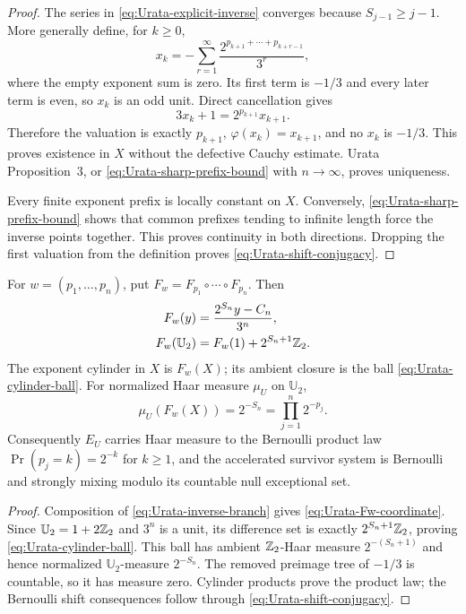 \begin{proof}
The series in \eqref{eq:Urata-explicit-inverse} converges because
$S_{j-1}\geq j-1$.  More generally define, for $k\geq0$,
\[
 x_k=-\sum_{r=1}^{\infty}
 \frac{2^{p_{k+1}+\cdots+p_{k+r-1}}}{3^r},
\]
where the empty exponent sum is zero.  Its first term is $-1/3$ and every
later term is even, so $x_k$ is an odd unit.  Direct cancellation gives
\begin{equation}
\label{eq:Urata-suffix-identity}
 3x_k+1=2^{p_{k+1}}x_{k+1}.
\end{equation}
Therefore the valuation is exactly $p_{k+1}$,
$\varphi(x_k)=x_{k+1}$, and no $x_k$ is $-1/3$.  This proves existence in
$X$ without the defective Cauchy estimate.  Urata Proposition~3, or
\eqref{eq:Urata-sharp-prefix-bound} with $n\to\infty$, proves uniqueness.

Every finite exponent prefix is locally constant on $X$.  Conversely,
\eqref{eq:Urata-sharp-prefix-bound} shows that common prefixes tending to
infinite length force the inverse points together.  This proves continuity in
both directions.  Dropping the first valuation from the definition proves
\eqref{eq:Urata-shift-conjugacy}.
\end{proof}

\begin{corollary}
\label{cor:Urata-cylinders-Haar}
For $w=(p_1,\ldots,p_n)$, put
$F_w=F_{p_1}\circ\cdots\circ F_{p_n}$.  Then
\begin{align}
 F_w(y)&=\frac{2^{S_n}y-C_n}{3^n},
 \label{eq:Urata-Fw-coordinate}\\
 F_w(\mathbb U_2)&=F_w(1)+2^{S_n+1}\mathbb{Z}_{2}.
 \label{eq:Urata-cylinder-ball}
\end{align}
The exponent cylinder in $X$ is $F_w(X)$; its ambient closure is the ball
\eqref{eq:Urata-cylinder-ball}.  For normalized Haar measure $\mu_U$
on $\mathbb U_2$,
\begin{equation}
\label{eq:Urata-cylinder-measure}
 \mu_U(F_w(X))
 =2^{-S_n}=\prod_{j=1}^{n}2^{-p_j}.
\end{equation}
Consequently $E_U$ carries Haar measure to the Bernoulli product law
$\Pr(p_j=k)=2^{-k}$ for $k\geq1$, and the accelerated survivor system is
Bernoulli and strongly mixing modulo its countable null exceptional set.
\end{corollary}

\begin{proof}
Composition of \eqref{eq:Urata-inverse-branch} gives
\eqref{eq:Urata-Fw-coordinate}.  Since
$\mathbb U_2=1+2\mathbb{Z}_{2}$ and $3^n$ is a unit, its difference set is exactly
$2^{S_n+1}\mathbb{Z}_{2}$, proving \eqref{eq:Urata-cylinder-ball}.  This ball has
ambient $\mathbb{Z}_{2}$-Haar measure $2^{-(S_n+1)}$ and hence normalized
$\mathbb U_2$-measure $2^{-S_n}$.  The removed preimage tree of $-1/3$ is
countable, so it has measure zero.  Cylinder products prove the product law;
the Bernoulli shift consequences follow through
\eqref{eq:Urata-shift-conjugacy}.
\end{proof}

